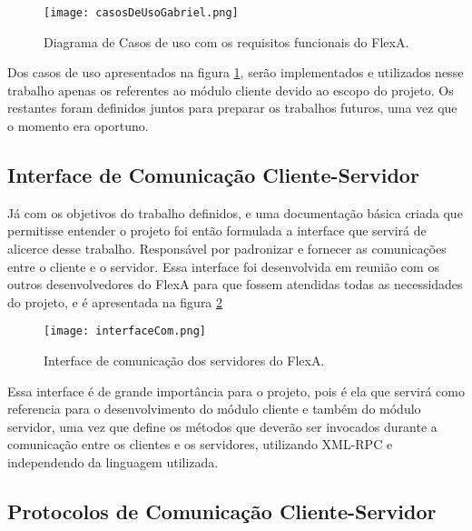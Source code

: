         \begin{figure}[!ht]
        \centering
        \texttt{[image: casosDeUsoGabriel.png]}
        \caption{Diagrama de Casos de uso com os requisitos funcionais do FlexA.}
        \label{fig:casosDeUsoGabriel}
        \end{figure}
        
        
        Dos casos de uso apresentados na figura \ref{fig:casosDeUsoGabriel}, serão implementados e utilizados nesse trabalho apenas os referentes ao módulo cliente devido ao escopo do projeto. Os restantes foram definidos juntos para preparar os trabalhos futuros, uma vez que o momento era oportuno.
        
        
        
        \subsection{Interface de Comunicação Cliente-Servidor}
        
        Já com os objetivos do trabalho definidos, e uma documentação básica criada que permitisse entender o projeto foi então formulada a interface que servirá de alicerce desse trabalho. Responsável por padronizar e fornecer as comunicações entre o cliente e o servidor. Essa interface foi desenvolvida em reunião com os outros desenvolvedores do FlexA para que fossem atendidas todas as necessidades do projeto, e é apresentada na figura \ref{fig:interfaceComunicacao}
       
        \begin{figure}
        \centering
        \texttt{[image: interfaceCom.png]}
        \caption{Interface de comunicação dos servidores do FlexA.}
        \label{fig:interfaceComunicacao}
        \end{figure}
        
        Essa interface é de grande importância para o projeto, pois é ela que servirá como referencia para o desenvolvimento do módulo cliente e também do módulo servidor, uma vez que define os métodos que deverão ser invocados durante a comunicação entre os clientes e os servidores, utilizando XML-RPC e independendo da linguagem utilizada.
        
        \subsection{Protocolos de Comunicação Cliente-Servidor}
        
